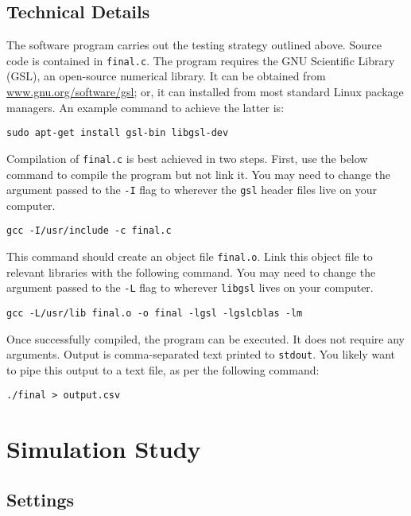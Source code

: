 \documentclass{article}
\begin{document}
\subsection{Technical Details}

The software program carries out the testing strategy outlined above. Source code is contained in \texttt{final.c}. 
The program requires the GNU Scientific Library (GSL), an
open-source numerical library. It can be obtained from
\url{www.gnu.org/software/gsl}; or, it can installed from most standard Linux
package managers. An example command to achieve the latter is:

\begin{center}
	\texttt{sudo apt-get install gsl-bin libgsl-dev}
\end{center}

Compilation of \texttt{final.c} is best achieved in two steps. First, use the below
command to compile the program but not link it. You may need to change the
argument passed to the \texttt{-I} flag to wherever the \texttt{gsl} header
files live on your computer. 

\begin{center}
	\texttt{gcc -I/usr/include -c final.c}
\end{center}

This command should create an object file \texttt{final.o}. Link this 
object file to relevant libraries with the following command.
You may need to change the argument passed to the \texttt{-L} flag to
wherever \texttt{libgsl} lives on your computer.

\begin{center}
	\texttt{gcc -L/usr/lib final.o -o final -lgsl -lgslcblas -lm}
\end{center}

Once successfully compiled, the program can be executed. It does not require any
arguments. Output is comma-separated text printed to \texttt{stdout}. You likely want to pipe this
output to a text file, as per the following command:

\begin{center}
	\texttt{./final > output.csv}
\end{center}

\section{Simulation Study}

\subsection{Settings}
\end{document}
